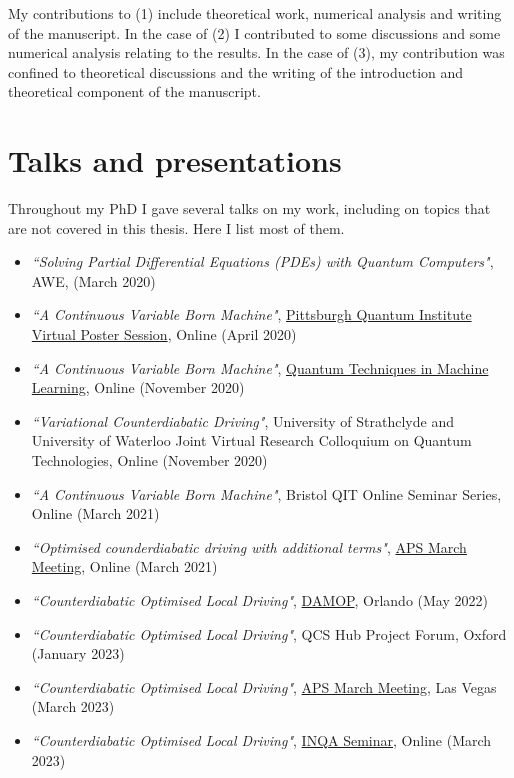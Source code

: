 My contributions to (1) include theoretical work, numerical analysis and writing of the manuscript. In the case of (2) I contributed to some discussions and some numerical analysis relating to the results. In the case of (3), my contribution was confined to theoretical discussions and the writing of the introduction and theoretical component of the manuscript.

\section{Talks and presentations}

Throughout my PhD I gave several talks on my work, including on topics that are not covered in this thesis. Here I list most of them.

\begin{itemize}
    \item \textit{``Solving Partial Differential Equations (PDEs) with Quantum Computers"}, AWE, (March 2020)
    \item \textit{``A Continuous Variable Born Machine"}, \href{https://www.youtube.com/live/ImQeEs0BcQs?feature=share&t=1996}{Pittsburgh Quantum Institute Virtual Poster Session}, Online (April 2020)
    \item \textit{``A Continuous Variable Born Machine"}, \href{https://www.youtube.com/watch?v=6v1IiXRToPU&t=3685s}{Quantum Techniques in Machine Learning}, Online (November 2020)
    \item \textit{``Variational Counterdiabatic Driving"}, University of Strathclyde and University of Waterloo Joint Virtual Research Colloquium on Quantum Technologies, Online (November 2020)
    \item \textit{``A Continuous Variable Born Machine"}, Bristol QIT Online Seminar Series, Online (March 2021)
    \item \textit{``Optimised counderdiabatic driving with additional terms"}, \href{https://meetings.aps.org/Meeting/MAR21/Session/S21.8}{APS March Meeting}, Online (March 2021)
    \item \textit{``Counterdiabatic Optimised Local Driving"}, \href{https://www.youtube.com/watch?v=YkoCPIlFl70}{DAMOP}, Orlando (May 2022)
    \item \textit{``Counterdiabatic Optimised Local Driving"}, QCS Hub Project Forum, Oxford (January 2023)
    \item \textit{``Counterdiabatic Optimised Local Driving"}, \href{https://meetings.aps.org/Meeting/MAR23/Session/Q71.8}{APS March Meeting}, Las Vegas (March 2023)
    \item \textit{``Counterdiabatic Optimised Local Driving"}, \href{https://youtu.be/-btmXDNaQX4}{INQA Seminar}, Online (March 2023)
\end{itemize}